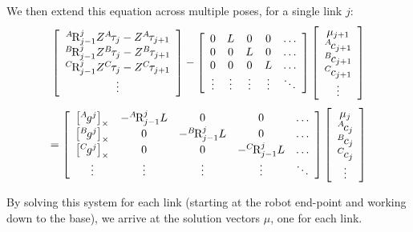 \documentclass[letterpaper,12pt]{article}
\newcommand{\R}[2]{{\mbox{R}}^{#1}_{#2}}
\newcommand{\p}[1]{{}^{#1}\hspace{-.1em}}
\begin{document}
      \noindent
      We then extend this equation across multiple poses, for a single link
      $j$:
      \begin{equation}
         \left[ \begin{array}{c}
            \p{A}\R{j}{j-1} Z \p{A}\tau_j - Z \p{A}\tau_{j+1} \\
            \p{B}\R{j}{j-1} Z \p{B}\tau_j - Z \p{B}\tau_{j+1} \\
            \p{C}\R{j}{j-1} Z \p{C}\tau_j - Z \p{C}\tau_{j+1} \\
            \vdots \\
         \end{array} \right]
         -
         \left[ \begin{array}{ccccc}
            0 & L & 0 & 0 & \dots \\
            0 & 0 & L & 0 & \dots \\
            0 & 0 & 0 & L & \dots \\
            \vdots & \vdots & \vdots & \vdots & \ddots
         \end{array} \right]
         \left[ \begin{array}{c}
            \mu_{j+1} \\ \p{A}c_{j+1} \\ \p{B}c_{j+1} \\ \p{C}c_{j+1} \\ \vdots
         \end{array} \right]
      \end{equation}
      \begin{equation}  
         =
         \left[ \begin{array}{ccccc}
            \left[ \p{A}g^j \right]_{\times} &
               -\p{A}\R{j}{j-1} L & 0 & 0 & \dots \\
            \left[ \p{B}g^j \right]_{\times} & 0 &
               -\p{B}\R{j}{j-1} L & 0 & \dots \\
            \left[ \p{C}g^j \right]_{\times} & 0 &
               0 & -\p{C}\R{j}{j-1} L & \dots \\
            \vdots & \vdots & \vdots & \vdots & \ddots
         \end{array} \right]
         \left[ \begin{array}{c}
            \mu_{j} \\ \p{A}c_{j} \\ \p{B}c_{j} \\ \p{C}c_{j} \\ \vdots
         \end{array} \right]
      \end{equation}
      
      By solving this system for each link (starting at the robot end-point
      and working down to the base), we arrive at the solution vectors $\mu$,
      one for each link.
\end{document}
